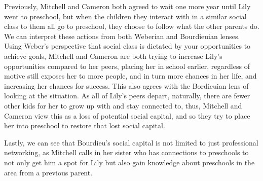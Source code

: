 \documentclass[12pt, letterpaper]{article}
\begin{document}
Previously, Mitchell and Cameron both agreed to wait one more year until Lily went to preschool, but when the children they interact with in a similar social class to them all go to preschool, they choose to follow what the other parents do. We can interpret these actions from both Weberian and Bourdieuian lenses. Using Weber's perspective that social class is dictated by your opportunities to achieve goals, Mitchell and Cameron are both trying to increase Lily's opportunities compared to her peers, placing her in school earlier, regardless of motive still exposes her to more people, and in turn more chances in her life, and increasing her chances for success. This also agrees with the Bordieuian lens of looking at the situation. As all of Lily's peers depart, naturally, there are fewer other kids for her to grow up with and stay connected to, thus, Mitchell and Cameron view this as a loss of potential social capital, and so they try to place her into preschool to restore that lost social capital.

Lastly, we can see that Bourdieu's social capital is not limited to just professional networking, as Mitchell calls in her sister who has connections to preschools to not only get him a spot for Lily but also gain knowledge about preschools in the area from a previous parent.









\clearpage

\printbibliography
\end{document}
